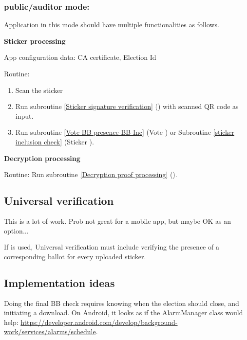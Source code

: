 \documentclass{article}
\begin{document}
\subsubsection{\localVotingCenter{}  public/auditor mode:}
Application in this mode should have multiple functionalities as follows.


\textbf{Sticker processing}

App configuration data: CA certificate, Election Id

Routine:
\begin{enumerate}
    \item Scan the sticker
    \item Run subroutine \ref{Sticker signature verification} (\StickersignatureVerification{}) with scanned QR code as input.
    \item Run subroutine \ref{Vote BB presence-BB Inc} (Vote \BBInclusionCheck{}) or Subroutine \ref{sticker inclusion check} (Sticker \BBInclusionCheck{}).

\end{enumerate}

\textbf{Decryption processing}

Routine: Run subroutine \ref{Decryption proof processing} (\DecryptionProof{}).

\subsection{Universal verification}
    This is a lot of work. Prob not great for a mobile app, but maybe OK as an option...

If \StickerBBUpload{} is used, Universal verification must include verifying the presence of a corresponding ballot for
every uploaded sticker.

    \subsection{Implementation ideas}
    Doing the final BB check requires knowing when the election should close, and initiating a download. On Android, it looks as if the AlarmManager class would help: \url{https://developer.android.com/develop/background-work/services/alarms/schedule}.
\end{document}
